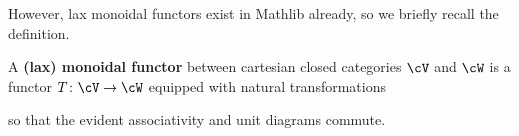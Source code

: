 However, lax monoidal functors exist in Mathlib already, so we briefly recall the definition.

\begin{definition}\label{defn:lax-monoidal-functor}
  \leanok
 A \textbf{(lax) monoidal functor} between cartesian closed categories $\cV$ and $\cW$ is a functor $T \colon \cV \to \cW$ equipped with natural transformations
\begin{center}
\end{center}
so that the evident associativity and unit diagrams commute.
\end{definition}


